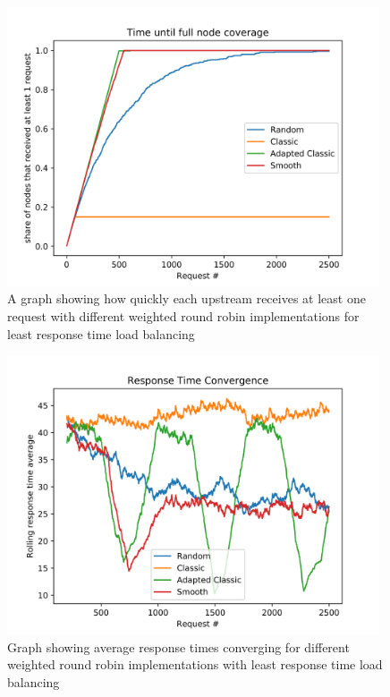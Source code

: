 \documentclass[draft,final]{vutinfth} %
\begin{document}
\begin{figure}
    \centering
    \includegraphics[width=11cm]{graphics/graphs/lb_imp_upstream_coverage.png}
    \caption{A graph showing how quickly each upstream receives at least one request with different weighted round robin implementations for least response time load balancing}
    \label{fig:lb_imp_upstream_coverage}
\end{figure}

\begin{figure}
    \centering
    \includegraphics[width=11cm]{graphics/graphs/lb_imp_trt_convergence.png}
    \caption{Graph showing average response times converging for different weighted round robin implementations with least response time load balancing}
    \label{fig:lb_imp_rt_convergence}
\end{figure}
\end{document}
